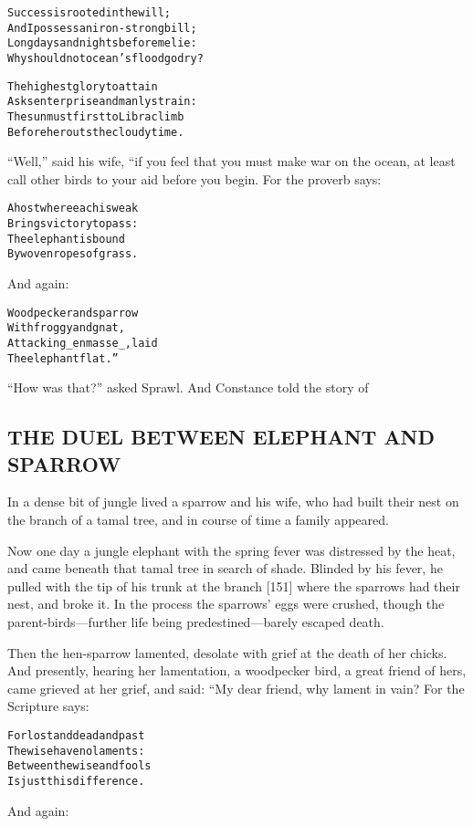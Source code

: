 \documentclass{article}
\renewenvironment{verbatim}{\begin{alltt}\normalfont\begin{centering}}{\end{centering}\end{alltt}}
\begin{document}
\begin{verbatim}
Success is rooted in the will;
And I possess an iron-strong bill;
Long days and nights before me lie:
Why should not ocean's flood go dry?

The highest glory to attain
Asks enterprise and manly strain:
The sun must first to Libra climb
Before he routs the cloudy time.
\end{verbatim}
``Well,'' said his wife, “if you feel that you must make war on the
ocean, at least call other birds to your aid before you begin. For
the proverb says:

\begin{verbatim}
A host where each is weak
    Brings victory to pass:
The elephant is bound
    By woven ropes of grass.
\end{verbatim}
And again:

\begin{verbatim}
Woodpecker and sparrow
    With froggy and gnat,
Attacking _en masse_, laid
    The elephant flat.”
\end{verbatim}
``How was that?'' asked Sprawl. And Constance told the story of

\subsection{THE DUEL BETWEEN ELEPHANT AND SPARROW}

In a dense bit of jungle lived a sparrow and his wife, who had
built their nest on the branch of a tamal tree, and in course of
time a family appeared.

Now one day a jungle elephant with the spring fever was distressed
by the heat, and came beneath that tamal tree in search of shade.
Blinded by his fever, he pulled with the tip of his trunk at the
branch [151] where the sparrows had their nest, and broke it. In
the process the sparrows' eggs were crushed, though the
parent-birds---further life being predestined---barely escaped
death.

Then the hen-sparrow lamented, desolate with grief at the death of
her chicks. And presently, hearing her lamentation, a woodpecker
bird, a great friend of hers, came grieved at her grief, and said:
“My dear friend, why lament in vain? For the Scripture says:

\begin{verbatim}
For lost and dead and past
    The wise have no laments:
Between the wise and fools
    Is just this difference.
\end{verbatim}
And again:
\end{document}
